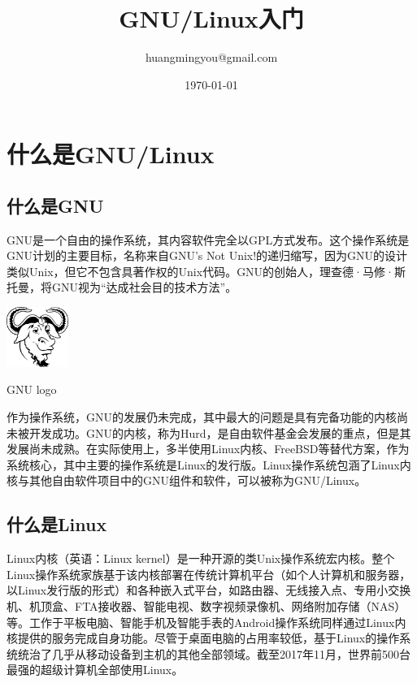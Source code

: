\documentclass[UTF8]{ctexart}
\title{GNU/Linux入门}
\author{huangmingyou@gmail.com}
\date{\today}
\begin{document}
\maketitle
\tableofcontents



\newpage
\section{\msyh 什么是GNU/Linux}
\subsection{\msyh 什么是GNU}
GNU是一个自由的操作系统，其内容软件完全以GPL方式发布。这个操作系统是GNU计划的主要目标，名称来自GNU's Not Unix!的递归缩写，因为GNU的设计类似Unix，但它不包含具著作权的Unix代码。GNU的创始人，理查德·马修·斯托曼，将GNU视为“达成社会目的技术方法”。

\begin{center}
\includegraphics[width=0.15\textwidth]{gnu.png}
\par
GNU logo
\end{center}
\par
作为操作系统，GNU的发展仍未完成，其中最大的问题是具有完备功能的内核尚未被开发成功。GNU的内核，称为Hurd，是自由软件基金会发展的重点，但是其发展尚未成熟。在实际使用上，多半使用Linux内核、FreeBSD等替代方案，作为系统核心，其中主要的操作系统是Linux的发行版。Linux操作系统包涵了Linux内核与其他自由软件项目中的GNU组件和软件，可以被称为GNU/Linux。


\subsection{\msyh 什么是Linux}
Linux内核（英语：Linux kernel）是一种开源的类Unix操作系统宏内核。整个Linux操作系统家族基于该内核部署在传统计算机平台（如个人计算机和服务器，以Linux发行版的形式）和各种嵌入式平台，如路由器、无线接入点、专用小交换机、机顶盒、FTA接收器、智能电视、数字视频录像机、网络附加存储（NAS）等。工作于平板电脑、智能手机及智能手表的Android操作系统同样通过Linux内核提供的服务完成自身功能。尽管于桌面电脑的占用率较低，基于Linux的操作系统统治了几乎从移动设备到主机的其他全部领域。截至2017年11月，世界前500台最强的超级计算机全部使用Linux。
\end{document}
